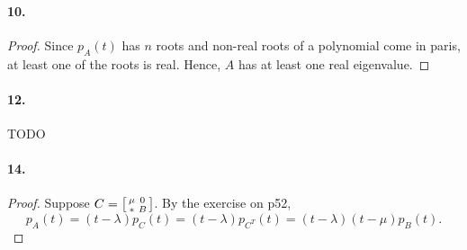   \paragraph{10.}
  \begin{proof}
    Since $p_A(t)$ has $n$ roots and non-real roots of a polynomial come in 
    paris, at least one of the roots is real. Hence, $A$ has at least one real
    eigenvalue.
  \end{proof}

  \paragraph{12.} TODO
    
  \paragraph{14.}
  \begin{proof}
    Suppose $C=\begin{bsmallmatrix} \mu & 0 \\ * & B \end{bsmallmatrix}$. By the
    exercise on p52,
    \[
      p_A(t) = (t-\lambda)p_C(t) = (t-\lambda)p_{C^T}(t) 
      = (t-\lambda)(t-\mu)p_B(t).
    \]
  \end{proof}

